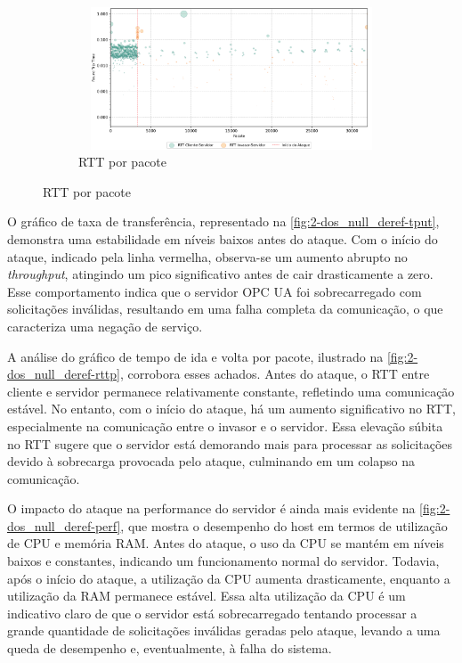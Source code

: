 \begin{figure}[htbp!]
\begin{subfigure}[t]{0.5\textwidth}
                \end{subfigure}%
                ~
                \begin{subfigure}[t]{0.5\textwidth}
                    \centering
                    \caption{\label{fig:2-dos_null_deref-rttp}RTT por pacote}
                    \includegraphics[width=1\textwidth, height=120pt]{USPSC-img/output/cropped/2-dos_function_call_null_deref-rttp.png}
                \end{subfigure}%
            \end{figure}

            O gráfico de taxa de transferência, representado na \autoref{fig:2-dos_null_deref-tput}, demonstra uma estabilidade em níveis baixos antes do ataque. Com o início do ataque, indicado pela linha vermelha, observa-se um aumento abrupto no \textit{throughput}, atingindo um pico significativo antes de cair drasticamente a zero. Esse comportamento indica que o servidor OPC UA foi sobrecarregado com solicitações inválidas, resultando em uma falha completa da comunicação, o que caracteriza uma negação de serviço.

            A análise do gráfico de tempo de ida e volta por pacote, ilustrado na \autoref{fig:2-dos_null_deref-rttp}, corrobora esses achados. Antes do ataque, o RTT entre cliente e servidor permanece relativamente constante, refletindo uma comunicação estável. No entanto, com o início do ataque, há um aumento significativo no RTT, especialmente na comunicação entre o invasor e o servidor. Essa elevação súbita no RTT sugere que o servidor está demorando mais para processar as solicitações devido à sobrecarga provocada pelo ataque, culminando em um colapso na comunicação.

            O impacto do ataque na performance do servidor é ainda mais evidente na \autoref{fig:2-dos_null_deref-perf}, que mostra o desempenho do host em termos de utilização de CPU e memória RAM. Antes do ataque, o uso da CPU se mantém em níveis baixos e constantes, indicando um funcionamento normal do servidor. Todavia, após o início do ataque, a utilização da CPU aumenta drasticamente, enquanto a utilização da RAM permanece estável. Essa alta utilização da CPU é um indicativo claro de que o servidor está sobrecarregado tentando processar a grande quantidade de solicitações inválidas geradas pelo ataque, levando a uma queda de desempenho e, eventualmente, à falha do sistema.

